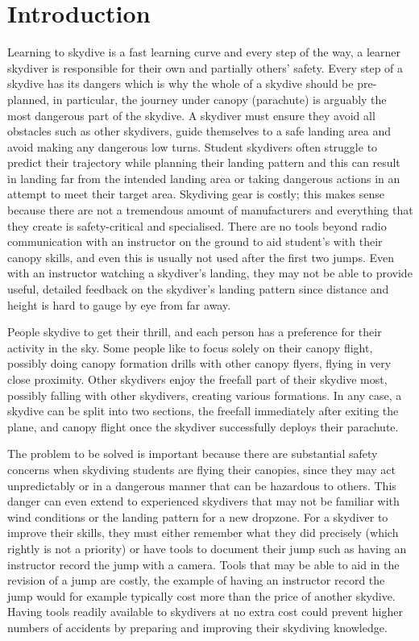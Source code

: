 \section{Introduction}\label{sec:introduction}
Learning to skydive is a fast learning curve and every step of the way, a learner skydiver is responsible for their own and partially others' safety. Every step of a skydive has its dangers which is why the whole of a skydive should be pre-planned, in particular, the journey under canopy (parachute) is arguably the most dangerous part of the skydive. A skydiver must ensure they avoid all obstacles such as other skydivers, guide themselves to a safe landing area and avoid making any dangerous low turns. Student skydivers often struggle to predict their trajectory while planning their landing pattern and this can result in landing far from the intended landing area or taking dangerous actions in an attempt to meet their target area.
Skydiving gear is costly; this makes sense because there are not a tremendous amount of manufacturers and everything that they create is safety-critical and specialised. There are no tools beyond radio communication with an instructor on the ground to aid student's with their canopy skills, and even this is usually not used after the first two jumps. Even with an instructor watching a skydiver's landing, they may not be able to provide useful, detailed feedback on the skydiver's landing pattern since distance and height is hard to gauge by eye from far away.

People skydive to get their thrill, and each person has a preference for their activity in the sky. Some people like to focus solely on their canopy flight, possibly doing canopy formation drills with other canopy flyers, flying in very close proximity. Other skydivers enjoy the freefall part of their skydive most, possibly falling with other skydivers, creating various formations.
In any case, a skydive can be split into two sections, the freefall immediately after exiting the plane, and canopy flight once the skydiver successfully deploys their parachute.

The problem to be solved is important because there are substantial safety concerns when skydiving students are flying their canopies, since they may act unpredictably or in a dangerous manner that can be hazardous to others. This danger can even extend to experienced skydivers that may not be familiar with wind conditions or the landing pattern for a new dropzone.
For a skydiver to improve their skills, they must either remember what they did precisely (which rightly is not a priority) or have tools to document their jump such as having an instructor record the jump with a camera. Tools that may be able to aid in the revision of a jump are costly, the example of having an instructor record the jump would for example typically cost more than the price of another skydive.
Having tools readily available to skydivers at no extra cost could prevent higher numbers of accidents by preparing and improving their skydiving knowledge.

